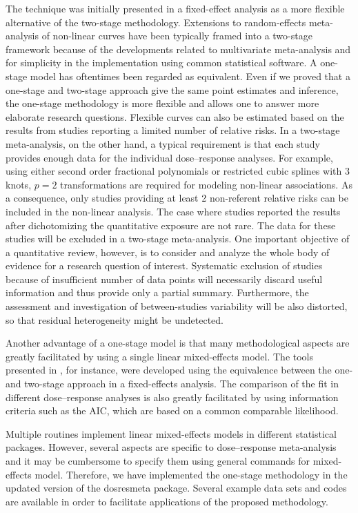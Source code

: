 \documentclass[11pt,a4paper,twoside,openany]{book}\usepackage{knitr}
\newcommand{\pkg}[1]{{\fontseries{b}\selectfont #1}}
\begin{document}
{{The technique was initially presented in a fixed-effect analysis as a more flexible alternative of the two-stage methodology. Extensions to random-effects meta-analysis of non-linear curves have been typically framed into a two-stage framework because of the developments related to multivariate meta-analysis and for simplicity in the implementation using common statistical software.  A one-stage model has oftentimes been regarded as equivalent. Even if we proved that a one-stage and two-stage approach give the same point estimates and inference, the one-stage methodology is more flexible and allows one to answer more elaborate research questions. Flexible curves can also be estimated based on the results from studies reporting a limited number of relative risks. In a two-stage meta-analysis, on the other hand, a typical requirement is that each study provides enough data for the individual dose--response analyses. For example, using either second order fractional polynomials or restricted cubic splines with 3 knots, $p = 2$ transformations are required for modeling non-linear associations. As a consequence, only studies providing at least 2 non-referent relative risks can be included in the non-linear analysis. The case where studies reported the results after dichotomizing the quantitative exposure are not rare. The data for these studies will be excluded in a two-stage meta-analysis. One important objective of a quantitative review, however, is to consider and analyze the whole body of evidence for a research question of interest. Systematic exclusion of studies because of insufficient number of data points will necessarily discard useful information and thus provide only a partial summary. Furthermore, the assessment and investigation of between-studies variability will be also distorted, so that residual heterogeneity might be undetected. 

Another advantage of a one-stage model is that many methodological aspects are greatly facilitated by using a single linear mixed-effects model. The tools presented in , for instance, were developed using the equivalence between the one- and two-stage approach in a fixed-effects analysis. The comparison of the fit in different dose--response analyses is also greatly facilitated by using information criteria such as the AIC, which are based on a common comparable likelihood.

Multiple routines implement linear mixed-effects models in different statistical packages. However, several aspects are specific to dose--response meta-analysis and it may be cumbersome to specify them using general commands for mixed-effects model. Therefore, we have implemented the one-stage methodology in the updated version of the \pkg{dosresmeta} package. Several example data sets and codes are available in order to facilitate applications of the proposed methodology.

}}
\end{document}
